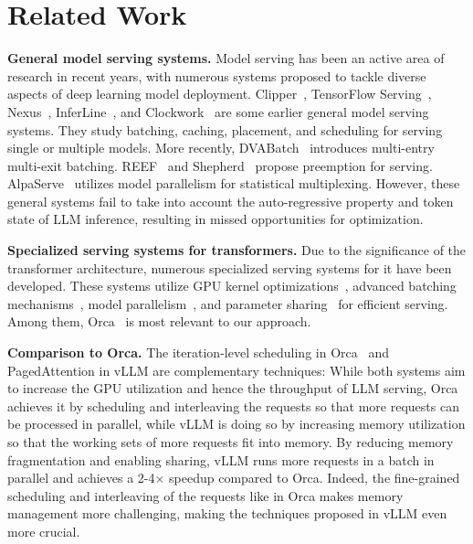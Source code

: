 \section{Related Work}
\label{sec:related_work}

\textbf{General model serving systems.} Model serving has been an active area of research in recent years, with numerous systems proposed to tackle diverse aspects of deep learning model deployment. Clipper~\cite{crankshaw2017clipper}, TensorFlow Serving~\cite{olston2017tensorflow}, Nexus~\cite{shen2019nexus}, InferLine~\cite{crankshaw2020inferline}, and Clockwork~\cite{gujarati2020serving} are some earlier general model serving systems. They study batching, caching, placement, and scheduling for serving single or multiple models. More recently, DVABatch~\cite{cui2022dvabatch} introduces multi-entry multi-exit batching. REEF~\cite{han2022microsecond} and  Shepherd~\cite{zhang2023shepherd} propose preemption for serving. AlpaServe~\cite{li2023alpaserve} utilizes model parallelism for statistical multiplexing. However, these general systems fail to take into account the auto-regressive property and token state of LLM inference, resulting in missed opportunities for optimization.

\textbf{Specialized serving systems for transformers.} Due to the significance of the transformer architecture, numerous specialized serving systems for it have been developed. These systems utilize GPU kernel optimizations~\cite{wang2021lightseq,aminabadi2022deepspeed,nvidiaft,ma2020rammer}, advanced batching mechanisms~\cite{fang2021turbotransformers,yu2022orca}, model parallelism~\cite{pope2022efficiently,yu2022orca,aminabadi2022deepspeed}, and parameter sharing~\cite{zhou2022pets} for efficient serving. Among them, Orca~\cite{yu2022orca} is most relevant to our approach.

\textbf{Comparison to Orca.} The iteration-level scheduling in Orca~\cite{yu2022orca} and PagedAttention in vLLM are complementary techniques: While both systems aim to increase the GPU utilization and hence the throughput of LLM serving, Orca achieves it by scheduling and interleaving the requests so that more requests can be processed in parallel, while vLLM is doing so by increasing memory utilization so that the working sets of more requests fit into memory. By reducing memory fragmentation and enabling sharing, vLLM runs more requests in a batch in parallel and achieves a 2-4$\times$ speedup compared to Orca. Indeed, the fine-grained scheduling and interleaving of the requests like in Orca makes memory management more challenging, making the techniques proposed in vLLM even more crucial.

